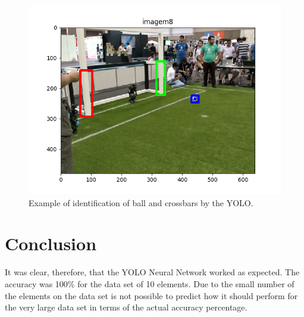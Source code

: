 \documentclass[journal,12pt,onecolumn,draftclsnofoot,]{IEEEtran}
\begin{document}
\begin{figure}
  \begin{center}
  \includegraphics[width=5in]{./../code/imagem8_detection.png}
  \caption{Example of identification of ball and crossbars by the YOLO.}
  \label{img:classification_five}
  \end{center}
\end{figure}

\section {Conclusion}

It was clear, therefore, that the YOLO Neural Network worked as expected. The accuracy was 100\% for the data set of 10 elements. Due to the small number of the elements on the data set is not possible to predict how it should perform for the very large data set in terms of the actual accuracy percentage.

\vfill
\end{document}
